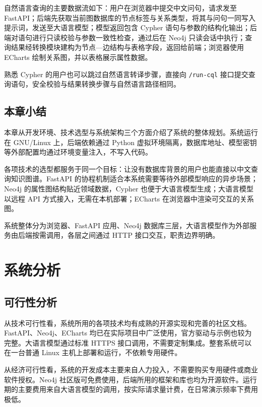 \documentclass[12pt,a4paper]{article}
\begin{document}
自然语言查询的主要数据流如下：用户在浏览器中提交中文问句，请求发至 FastAPI；后端先获取当前图数据库的节点标签与关系类型，将其与问句一同写入提示词，发送至大语言模型；模型返回包含 Cypher 语句与参数的结构化输出；后端对语句进行只读校验与参数一致性检查，通过后在 Neo4j 只读会话中执行；查询结果经转换模块建构为节点—边结构与表格字段，返回给前端；浏览器使用 ECharts 绘制关系图，并以表格展示属性数据。

熟悉 Cypher 的用户也可以跳过自然语言转译步骤，直接向 \texttt{/run-cql} 接口提交查询语句，安全校验与结果转换步骤与自然语言路径相同。

\subsection{本章小结}

本章从开发环境、技术选型与系统架构三个方面介绍了系统的整体规划。系统运行在 GNU/Linux 上，后端依赖通过 Python 虚拟环境隔离，数据库地址、模型密钥等外部配置均通过环境变量注入，不写入代码。

各项技术的选型都服务于同一个目标：让没有数据库背景的用户也能直接以中文查询知识图谱。FastAPI 的协程机制适合本系统需要等待外部模型响应的异步场景；Neo4j 的属性图结构贴近领域数据，Cypher 也便于大语言模型生成；大语言模型以远程 API 方式接入，无需在本机部署；ECharts 在浏览器中渲染可交互的关系图。

系统整体分为浏览器、FastAPI 应用、Neo4j 数据库三层，大语言模型作为外部服务由后端按需调用，各层之间通过 HTTP 接口交互，职责边界明确。

\newpage

\section{系统分析}

\subsection{可行性分析}

从技术可行性看，系统所用的各项技术均有成熟的开源实现和完善的社区文档。FastAPI、Neo4j、ECharts 均已在实际项目中广泛使用，官方驱动与示例也较为完整。大语言模型通过标准 HTTPS 接口调用，不需要定制集成。整套系统可以在一台普通 Linux 主机上部署和运行，不依赖专用硬件。

从经济可行性看，系统的开发成本主要来自人力投入，不需要购买专用硬件或商业软件授权。Neo4j 社区版可免费使用，后端所用的框架和库也均为开源软件。运行期的主要费用来自大语言模型的调用，按实际请求量计费，在日常演示频率下费用极低。
\end{document}

